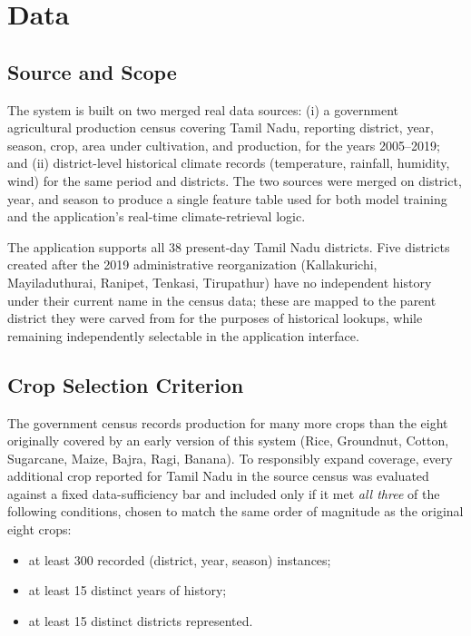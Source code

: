 \documentclass[conference]{IEEEtran}
\begin{document}
\section{Data}

\subsection{Source and Scope}

The system is built on two merged real data sources: (i) a government agricultural
production census covering Tamil Nadu, reporting district, year, season, crop, area
under cultivation, and production, for the years 2005--2019; and (ii) district-level
historical climate records (temperature, rainfall, humidity, wind) for the same
period and districts. The two sources were merged on district, year, and season to
produce a single feature table used for both model training and the application's
real-time climate-retrieval logic.

The application supports all 38 present-day Tamil Nadu districts. Five districts
created after the 2019 administrative reorganization (Kallakurichi, Mayiladuthurai,
Ranipet, Tenkasi, Tirupathur) have no independent history under their current name in
the census data; these are mapped to the parent district they were carved from for
the purposes of historical lookups, while remaining independently selectable in the
application interface.

\subsection{Crop Selection Criterion}

The government census records production for many more crops than the eight
originally covered by an early version of this system (Rice, Groundnut, Cotton,
Sugarcane, Maize, Bajra, Ragi, Banana). To responsibly expand coverage, every
additional crop reported for Tamil Nadu in the source census was evaluated against a
fixed data-sufficiency bar and included only if it met \emph{all three} of the
following conditions, chosen to match the same order of magnitude as the original
eight crops:
\begin{itemize}
  \item at least 300 recorded (district, year, season) instances;
  \item at least 15 distinct years of history;
  \item at least 15 distinct districts represented.
\end{itemize}
\end{document}
